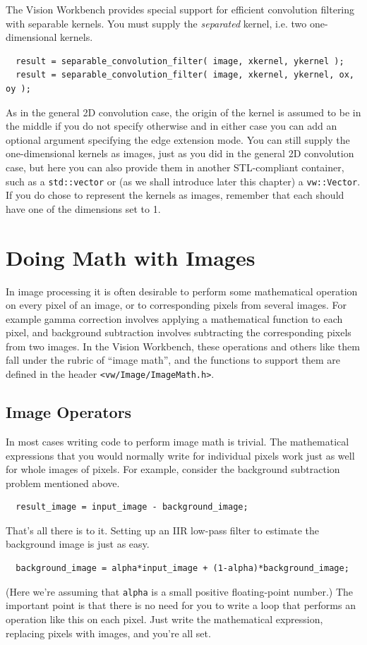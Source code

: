 The Vision Workbench provides special support for efficient 
convolution filtering with separable kernels.  You must supply the 
{\it separated} kernel, i.e. two one-dimensional kernels.
\begin{verbatim}
  result = separable_convolution_filter( image, xkernel, ykernel );
  result = separable_convolution_filter( image, xkernel, ykernel, ox, oy );
\end{verbatim}
As in the general 2D convolution case, the origin of the kernel is 
assumed to be in the middle if you do not specify otherwise and in 
either case you can add an optional argument specifying the edge 
extension mode.  You can still supply the one-dimensional kernels as 
images, just as you did in the general 2D convolution case, but here 
you can also provide them in another STL-compliant container, such 
as a \verb#std::vector# or (as we shall introduce later this chapter) 
a \verb#vw::Vector#.  If you do chose to represent the kernels as 
images, remember that each should have one of the dimensions set to 1.

\section{Doing Math with Images}

In image processing it is often desirable to perform some mathematical 
operation on every pixel of an image, or to corresponding pixels from 
several images.  For example gamma correction involves applying a 
mathematical function to each pixel, and background subtraction involves
subtracting the corresponding pixels from two images.  In the Vision 
Workbench, these operations and others like them fall under the rubric 
of ``image math'', and the functions to support them are defined in the 
header \verb#<vw/Image/ImageMath.h>#.

\subsection{Image Operators}

In most cases writing code to perform image math is trivial.  The 
mathematical expressions that you would normally write for individual 
pixels work just as well for whole images of pixels.  For example, 
consider the background subtraction problem mentioned above.
\begin{verbatim}
  result_image = input_image - background_image;
\end{verbatim}
That's all there is to it.  Setting up an IIR low-pass filter to 
estimate the background image is just as easy.
\begin{verbatim}
  background_image = alpha*input_image + (1-alpha)*background_image;
\end{verbatim}
(Here we're assuming that \verb#alpha# is a small positive
floating-point number.)  The important point is that there is no need
for you to write a loop that performs an operation like this on each
pixel.  Just write the mathematical expression, replacing pixels with
images, and you're all set.

